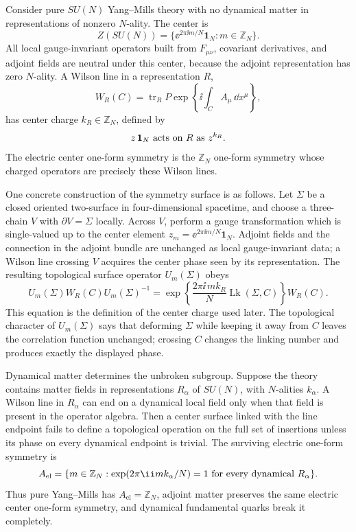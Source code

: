 Consider pure \(SU(N)\) Yang--Mills theory with no dynamical matter in
representations of nonzero \(N\)-ality.  The center is
\[
  Z(SU(N))=\{ \ee^{2\pi\ii m/N}\mathbf 1_N:m\in\mathbb Z_N\}.
\]
All local gauge-invariant operators built from \(F_{\mu\nu}\), covariant
derivatives, and adjoint fields are neutral under this center, because the
adjoint representation has zero \(N\)-ality.  A Wilson line in a representation
\(R\),
\[
  W_R(C)=\operatorname{tr}_R P
  \exp\left\{\ii\int_C A_\mu\,\dd x^\mu\right\},
\]
has center charge \(k_R\in\mathbb Z_N\), defined by
\[
  z\,\mathbf 1_N\hbox{ acts on }R\hbox{ as }z^{k_R}.
\]
The electric center one-form symmetry is the \(\mathbb Z_N\) one-form
symmetry whose charged operators are precisely these Wilson lines.

One concrete construction of the symmetry surface is as follows.  Let
\(\Sigma\) be a closed oriented two-surface in four-dimensional spacetime, and
choose a three-chain \(V\) with \(\partial V=\Sigma\) locally.  Across \(V\),
perform a gauge transformation which is single-valued up to the center element
\(z_m=\ee^{2\pi\ii m/N}\mathbf 1_N\).  Adjoint fields and the connection in
the adjoint bundle are unchanged as local gauge-invariant data; a Wilson line
crossing \(V\) acquires the center phase seen by its representation.  The
resulting topological surface operator \(U_m(\Sigma)\) obeys
\begin{equation}
  U_m(\Sigma)W_R(C)U_m(\Sigma)^{-1}
  =
  \exp\left\{
    \frac{2\pi\ii\,m k_R}{N}\operatorname{Lk}(\Sigma,C)
  \right\}
  W_R(C).
  \label{eq:center-one-form-action-wilson-loop}
\end{equation}
This equation is the definition of the center charge used later.  The
topological character of \(U_m(\Sigma)\) says that deforming \(\Sigma\) while
keeping it away from \(C\) leaves the correlation function unchanged; crossing
\(C\) changes the linking number and produces exactly the displayed phase.

Dynamical matter determines the unbroken subgroup.  Suppose the theory
contains matter fields in representations \(R_\alpha\) of \(SU(N)\), with
\(N\)-alities \(k_\alpha\).  A Wilson line in \(R_\alpha\) can end on a
dynamical local field only when that field is present in the operator algebra.
Then a center surface linked with the line endpoint fails to define a
topological operation on the full set of insertions unless its phase on every
dynamical endpoint is trivial.  The surviving electric one-form symmetry is
\begin{equation}
  A_{\mathrm{el}}
  =
  \{m\in\mathbb Z_N:
    \exp(2\pi\ii m k_\alpha/N)=1
    \hbox{ for every dynamical }R_\alpha\}.
  \label{eq:center-one-form-unbroken-subgroup}
\end{equation}
Thus pure Yang--Mills has \(A_{\mathrm{el}}=\mathbb Z_N\), adjoint matter
preserves the same electric center one-form symmetry, and dynamical
fundamental quarks break it completely.


